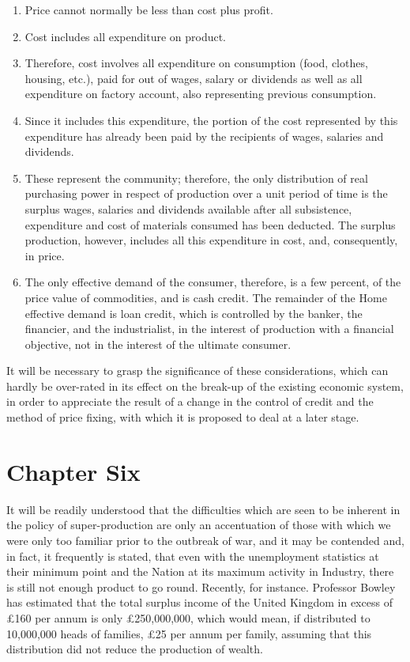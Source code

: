 \documentclass{book}
\begin{document}
\begin{enumerate}
	\item Price cannot normally be less than cost plus profit.


	\item Cost includes all expenditure on product.


	\item Therefore, cost involves all expenditure on consumption (food, clothes, housing, etc.), paid for out of wages, salary or dividends as well as all expenditure on factory account, also representing previous consumption.


	\item Since it includes this expenditure, the portion of the cost represented by this expenditure has already been paid by the recipients of wages, salaries and dividends.


	\item These represent the community; therefore, the only distribution of real purchasing power in respect of production over a unit period of time is the surplus wages, salaries and dividends available after all subsistence, expenditure and cost of materials consumed has been deducted. The surplus production, however, includes all this expenditure in cost, and, consequently, in price.


	\item The only effective demand of the consumer, therefore, is a few percent, of the price value of commodities, and is cash credit. The remainder of the Home effective demand is loan credit, which is controlled by the banker, the financier, and the industrialist, in the interest of production with a financial objective, not in the interest of the ultimate consumer.



\end{enumerate}
It will be necessary to grasp the significance of these considerations, which can hardly be over-rated in its effect on the break-up of the existing economic system, in order to appreciate the result of a change in the control of credit and the method of price fixing, with which it is proposed to deal at a later stage.

\chapter{Chapter Six}
\label{chapter-6}
It will be readily understood that the difficulties which are seen to be inherent in the policy of super-production are only an accentuation of those with which we were only too familiar prior to the outbreak of war, and it may be contended and, in fact, it frequently is stated, that even with the unemployment statistics at their minimum point and the Nation at its maximum activity in Industry, there is still not enough product to go round. Recently, for instance. Professor Bowley has estimated that the total surplus income of the United Kingdom in excess of £160 per annum is only £250,000,000, which would mean, if distributed to 10,000,000 heads of families, £25 per annum per family, assuming that this distribution did not reduce the production of wealth.
\end{document}
